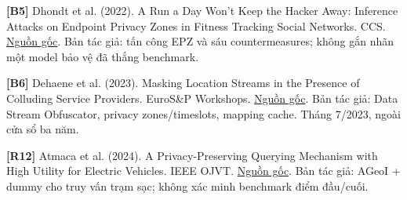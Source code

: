 \documentclass[10pt,a4paper]{article}
\begin{document}
\par\hypertarget{ref-B5}{}\textbf{[B5]} Dhondt et al. (2022). A Run a Day Won’t Keep the Hacker Away: Inference Attacks on Endpoint Privacy Zones in Fitness Tracking Social Networks. CCS. \href{https://people.cs.kuleuven.be/~stijn.volckaert/papers/2022_CCS_Fitness_Tracking.pdf}{Nguồn gốc}. Bản tác giả: tấn công EPZ và sáu countermeasures; không gắn nhãn một model bảo vệ đã thắng benchmark.
\par\hypertarget{ref-B6}{}\textbf{[B6]} Dehaene et al. (2023). Masking Location Streams in the Presence of Colluding Service Providers. EuroS\&P Workshops. \href{https://lirias.kuleuven.be/bitstream/20.500.12942/720391/2/Data_Stream_Obfuscator_camera_ready.pdf}{Nguồn gốc}. Bản tác giả: Data Stream Obfuscator, privacy zones/timeslots, mapping cache. Tháng 7/2023, ngoài cửa sổ ba năm.
\par\hypertarget{ref-R12}{}\textbf{[R12]} Atmaca et al. (2024). A Privacy-Preserving Querying Mechanism with High Utility for Electric Vehicles. IEEE OJVT. \href{https://wrap.warwick.ac.uk/id/eprint/183198/1/WRAP-privacy-preserving-querying-mechanism-high-utility-electric-vehicles-2024.pdf}{Nguồn gốc}. Bản tác giả: AGeoI + dummy cho truy vấn trạm sạc; không xác minh benchmark điểm đầu/cuối.
\end{document}
